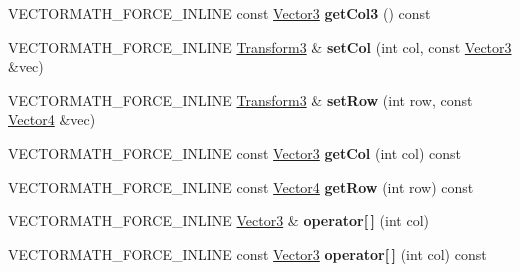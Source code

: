 \begin{DoxyCompactItemize}
V\+E\+C\+T\+O\+R\+M\+A\+T\+H\+\_\+\+F\+O\+R\+C\+E\+\_\+\+I\+N\+L\+I\+NE const \hyperlink{classVectormath_1_1Aos_1_1Vector3}{Vector3} {\bfseries get\+Col3} () const
\item 
\mbox{\label{classVectormath_1_1Aos_1_1Transform3_a8d467fe91a930b6d408aef5b82a0358e}} 
V\+E\+C\+T\+O\+R\+M\+A\+T\+H\+\_\+\+F\+O\+R\+C\+E\+\_\+\+I\+N\+L\+I\+NE \hyperlink{classVectormath_1_1Aos_1_1Transform3}{Transform3} \& {\bfseries set\+Col} (int col, const \hyperlink{classVectormath_1_1Aos_1_1Vector3}{Vector3} \&vec)
\item 
\mbox{\label{classVectormath_1_1Aos_1_1Transform3_a3293a9d1716899ffaea6b68636df386d}} 
V\+E\+C\+T\+O\+R\+M\+A\+T\+H\+\_\+\+F\+O\+R\+C\+E\+\_\+\+I\+N\+L\+I\+NE \hyperlink{classVectormath_1_1Aos_1_1Transform3}{Transform3} \& {\bfseries set\+Row} (int row, const \hyperlink{classVectormath_1_1Aos_1_1Vector4}{Vector4} \&vec)
\item 
\mbox{\label{classVectormath_1_1Aos_1_1Transform3_a0fde4d34e691edaaae846ff12488996d}} 
V\+E\+C\+T\+O\+R\+M\+A\+T\+H\+\_\+\+F\+O\+R\+C\+E\+\_\+\+I\+N\+L\+I\+NE const \hyperlink{classVectormath_1_1Aos_1_1Vector3}{Vector3} {\bfseries get\+Col} (int col) const
\item 
\mbox{\label{classVectormath_1_1Aos_1_1Transform3_a29f6fab3337a3b14e976d538a5f59417}} 
V\+E\+C\+T\+O\+R\+M\+A\+T\+H\+\_\+\+F\+O\+R\+C\+E\+\_\+\+I\+N\+L\+I\+NE const \hyperlink{classVectormath_1_1Aos_1_1Vector4}{Vector4} {\bfseries get\+Row} (int row) const
\item 
\mbox{\label{classVectormath_1_1Aos_1_1Transform3_adfe27c3c202f7445321c2c19b33cff36}} 
V\+E\+C\+T\+O\+R\+M\+A\+T\+H\+\_\+\+F\+O\+R\+C\+E\+\_\+\+I\+N\+L\+I\+NE \hyperlink{classVectormath_1_1Aos_1_1Vector3}{Vector3} \& {\bfseries operator\mbox{[}$\,$\mbox{]}} (int col)
\item 
\mbox{\label{classVectormath_1_1Aos_1_1Transform3_a4ff6e61383bee47f99d6bc010e48414f}} 
V\+E\+C\+T\+O\+R\+M\+A\+T\+H\+\_\+\+F\+O\+R\+C\+E\+\_\+\+I\+N\+L\+I\+NE const \hyperlink{classVectormath_1_1Aos_1_1Vector3}{Vector3} {\bfseries operator\mbox{[}$\,$\mbox{]}} (int col) const

\end{DoxyCompactItemize}
